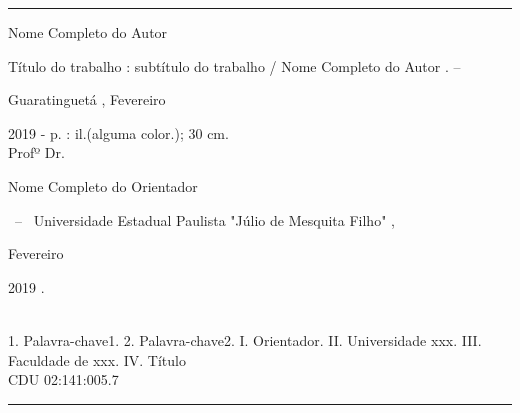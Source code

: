 \documentclass[
  12pt,		%
  a4paper,	%
  openright,%
  oneside,	%
  chapter=TITLE,		%
  section=TITLE,		%
  english,	%
  french,	%
  spanish,	%
  brazil
]{abntex2}
\newcommand{\nomeDoAutor}{
    Nome Completo do Autor
    }
\newcommand{\tituloDoTrabalho}{
    Título do trabalho
    }
\newcommand{\subtituloDoTrabalho}{
    subtítulo do trabalho
    }
\newcommand{\mesDeEntrega}{
    Fevereiro
    }
\newcommand{\anoDeEntrega}{
    2019
    }
\newcommand{\nomeDoOrientador}{
    Nome Completo do Orientador
    }
\newcommand{\tituloDoOrientador}{
    Profº Dr.
    }
\newcommand{\nomeDaUniversidade}{
    Universidade Estadual Paulista "Júlio de Mesquita Filho"
    }
\newcommand{\nomeDaCidade}{
    Guaratinguetá
    }
\begin{document}
    
    \imprimircapa
    \imprimirfolhaderosto
    
    \begin{fichacatalografica}
     \sffamily
        \vspace*{15cm} %
        \hrule %
        \begin{center} %
        \begin{minipage}[c]{12.5cm} %
        \nomeDoAutor
        \hspace{0.5cm} \tituloDoTrabalho: \subtituloDoTrabalho / \nomeDoAutor. --
        \nomeDaCidade, \mesDeEntrega \anoDeEntrega-
        \hspace{0.5cm} \pageref{LastPage} p. : il.(alguma color.); 30 cm.\\
        \hspace{0.5cm} \tituloDoOrientador \nomeDoOrientador\\
        \hspace{0.5cm}
        \parbox[t]{\textwidth}{\imprimirtipotrabalho~--~\nomeDaUniversidade,
        \mesDeEntrega \anoDeEntrega.}\\
        \hspace{0.5cm}
        1. Palavra-chave1.
        2. Palavra-chave2.
        I. Orientador.
        II. Universidade xxx.
        III. Faculdade de xxx.
        IV. Título\\
        \hspace{8.75cm} CDU 02:141:005.7\\
        \end{minipage}
        \end{center}
        \hrule
    \end{fichacatalografica}


    
    
\end{document}
